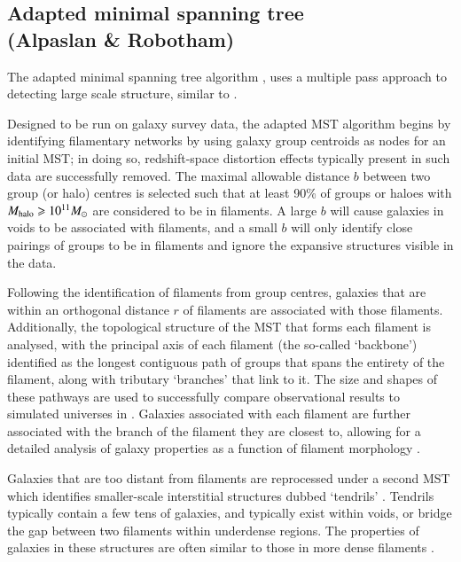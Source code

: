 \subsection{Adapted minimal spanning tree\\ \hskip 0.75cm(Alpaslan \& Robotham)}
\label{section:Alpaslan}


The adapted minimal spanning tree algorithm \citep[][see also \citealt{barrow1985,2004A&A...418....7D,colberg2007}]{2014MNRAS.438..177A}, uses a multiple pass approach to detecting large scale structure, similar to \cite{Murphy2011}. 

Designed to be run on galaxy survey data, the adapted MST algorithm begins by identifying filamentary networks by using galaxy group centroids as nodes for an initial MST; in doing so, redshift-space distortion effects typically present in such data are successfully removed. The maximal allowable distance $b$ between two group (or halo) centres is selected such that at least 90\% of groups or haloes with $M_{\rm halo} \geq 10^{11} M_{\odot}$ are considered to be in filaments. A large $b$ will cause galaxies in voids to be associated with filaments, and a small $b$ will only identify close pairings of groups to be in filaments and ignore the expansive structures visible in the data.

Following the identification of filaments from group centres, galaxies that are within an orthogonal distance $r$ of filaments are associated with those filaments. Additionally, the topological structure of the MST that forms each filament is analysed, with the principal axis of each filament (the so-called `backbone') identified as the longest contiguous path of groups that spans the entirety of the filament, along with tributary `branches' that link to it. The size and shapes of these pathways are used to successfully compare observational results to simulated universes in \cite{2014MNRAS.438..177A}. Galaxies associated with each filament are further associated with the branch of the filament they are closest to, allowing for a detailed analysis of galaxy properties as a function of filament morphology \citep{2015MNRAS.451.3249A,2016MNRAS.457.2287A}.

Galaxies that are too distant from filaments are reprocessed under a second MST which identifies smaller-scale interstitial structures dubbed `tendrils' \citep{2014MNRAS.440L.106A}. Tendrils typically contain a few tens of galaxies, and typically exist within voids, or bridge the gap between two filaments within underdense regions. The properties of galaxies in these structures are often similar to those in more dense filaments \citep{2015MNRAS.451.3249A}.

